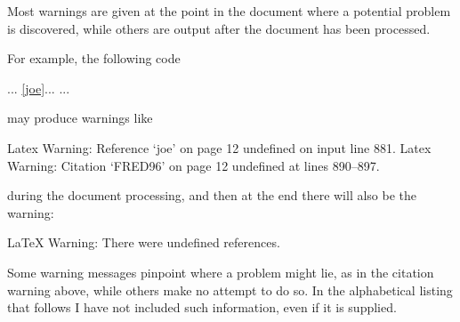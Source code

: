 
    Most warnings are given at the point in the document where
a potential problem is discovered, while others are output
after the document has been processed.

For example, the following code
\begin{lcode}
... \ref{joe}... \cite{FRED96} ...
\end{lcode}
may produce warnings like
\begin{lcode}
Latex Warning: Reference `joe' on page 12 undefined 
               on input line 881.
Latex Warning: Citation `FRED96' on page 12 undefined 
               at lines 890--897.
\end{lcode}
during the document processing, and then at the end there will also
be the warning:
\begin{lcode}
LaTeX Warning: There were undefined references. 
\end{lcode}

Some warning messages pinpoint where a problem might lie, as in the citation
warning above, while others make no attempt to do so. In the alphabetical
listing that follows I have not included such information, even if it is
supplied.

